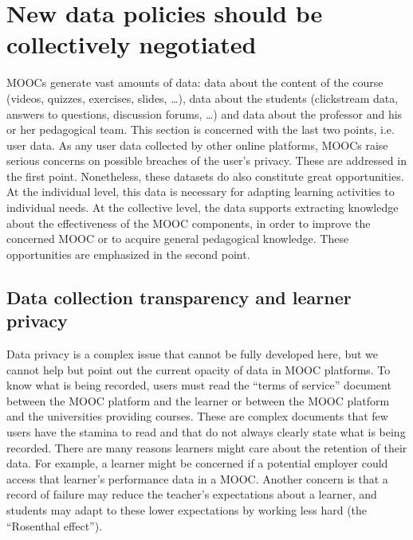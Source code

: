 \section{New data policies should be collectively negotiated}

MOOCs generate vast amounts of data: data about the content of the
course (videos, quizzes, exercises, slides, \ldots{}), data about the
students
(clickstream data, answers to questions, discussion forums, \ldots) and data
about the professor and his or her pedagogical team. This section is
concerned with the last two points, i.e. user data.  As any user data
collected by other online platforms, MOOCs raise serious concerns on
possible breaches of the user's privacy. These are addressed in the
first point. Nonetheless, these datasets do also constitute great
opportunities. At the individual level, this data is necessary for
adapting learning activities to individual needs. At the collective
level, the data supports extracting knowledge about the effectiveness of
the MOOC components, in order to improve the concerned MOOC or to
acquire general pedagogical knowledge. These opportunities are
emphasized in the second point.
      	

\subsection{Data collection transparency and learner privacy}

Data privacy is a complex issue that cannot be fully developed here, but
we cannot help but point out the current opacity of data in MOOC
platforms.  To know what is being recorded, users must read the
``terms of service'' document between the MOOC platform and the learner
or between the MOOC platform and the
universities providing courses. 
These are complex documents that few users have the stamina to read
and that do not always clearly state what is being recorded. 
There are many reasons learners might care about the retention of their
data.
For example, a learner might be concerned if a potential employer
could access that learner's performance data in a MOOC.
Another concern is that a record of
failure may reduce the teacher's expectations about a learner,
and students may adapt to these lower expectations by
working less hard (the ``Rosenthal effect'').

